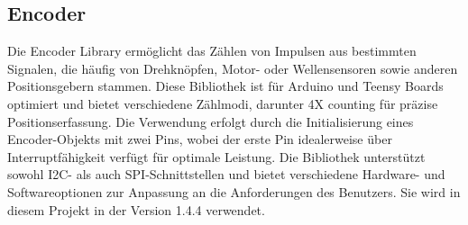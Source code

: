 \subsection{Encoder}
Die Encoder Library ermöglicht das Zählen von Impulsen aus bestimmten Signalen, die häufig von Drehknöpfen, Motor- oder Wellensensoren sowie anderen Positionsgebern stammen. Diese Bibliothek ist für Arduino und Teensy Boards optimiert und bietet verschiedene Zählmodi, darunter 4X counting für präzise Positionserfassung. Die Verwendung erfolgt durch die Initialisierung eines Encoder-Objekts mit zwei Pins, wobei der erste Pin idealerweise über Interruptfähigkeit verfügt für optimale Leistung. Die Bibliothek unterstützt sowohl I2C- als auch SPI-Schnittstellen und bietet verschiedene Hardware- und Softwareoptionen zur Anpassung an die Anforderungen des Benutzers. Sie wird in diesem Projekt in der Version 1.4.4 verwendet.\cite{PaulStoffregen.2024}


